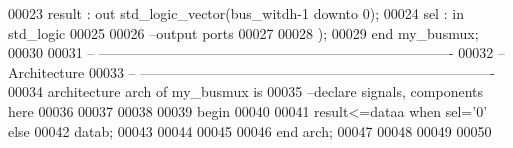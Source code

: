 \begin{DoxyCode}
00023           \textcolor{vhdlchar}{result}            \textcolor{vhdlchar}{:} \textcolor{keywordflow}{out} \textcolor{comment}{std\_logic\_vector}\textcolor{vhdlchar}{(}\textcolor{vhdlchar}{bus_witdh}\textcolor{vhdlchar}{-}\textcolor{vhdllogic}{}\textcolor{vhdllogic}{1} \textcolor{keywordflow}{downto} \textcolor{vhdllogic}{}\textcolor{vhdllogic}{0}\textcolor{vhdlchar}{)};
00024           \textcolor{vhdlchar}{sel}               \textcolor{vhdlchar}{:} \textcolor{keywordflow}{in} \textcolor{comment}{std\_logic}
00025 
00026 \textcolor{keyword}{        --output ports }
00027         
00028         \textcolor{vhdlchar}{)};
00029 \textcolor{keywordflow}{end} \textcolor{vhdlchar}{my\_busmux};
00030 
00031 \textcolor{keyword}{-- ----------------------------------------------------------------------------}
00032 \textcolor{keyword}{-- Architecture}
00033 \textcolor{keyword}{-- ----------------------------------------------------------------------------}
00034 \textcolor{keywordflow}{architecture} arch \textcolor{keywordflow}{of} my_busmux is
00035 \textcolor{keyword}{--declare signals,  components here}
00036 
00037 
00038   
00039 \textcolor{vhdlkeyword}{begin}
00040 
00041 \textcolor{vhdlchar}{result}\textcolor{vhdlchar}{<=}\textcolor{vhdlchar}{dataa} \textcolor{keywordflow}{when} \textcolor{vhdlchar}{sel}\textcolor{vhdlchar}{=}\textcolor{vhdlchar}{'}\textcolor{vhdllogic}{}\textcolor{vhdllogic}{0}\textcolor{vhdlchar}{'} \textcolor{keywordflow}{else} 
00042         \textcolor{vhdlchar}{datab};
00043      
00044      
00045   
00046 \textcolor{keywordflow}{end} \textcolor{vhdlchar}{arch};   
00047 
00048 
00049 
00050 
\end{DoxyCode}
